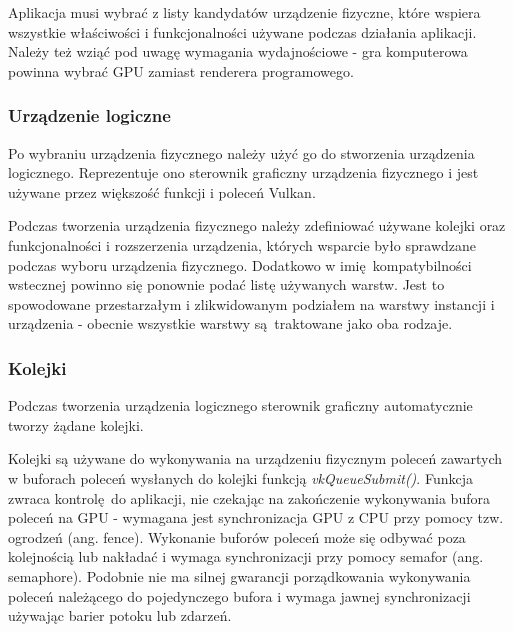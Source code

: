 Aplikacja musi wybrać z listy kandydatów urządzenie fizyczne, które wspiera wszystkie właściwości i funkcjonalności używane podczas działania aplikacji. Należy też wziąć pod uwagę wymagania wydajnościowe - gra komputerowa powinna wybrać GPU zamiast renderera programowego.


\subsubsection{Urządzenie logiczne}

Po wybraniu urządzenia fizycznego należy użyć go do stworzenia urządzenia logicznego. Reprezentuje ono
sterownik graficzny urządzenia fizycznego i jest używane przez większość funkcji i poleceń Vulkan.

Podczas tworzenia urządzenia fizycznego należy zdefiniować używane kolejki oraz funkcjonalności i rozszerzenia urządzenia, których wsparcie było sprawdzane podczas wyboru urządzenia fizycznego.
Dodatkowo w imię kompatybilności wstecznej powinno się ponownie podać listę używanych warstw. Jest to spowodowane przestarzałym i zlikwidowanym podziałem na warstwy instancji i urządzenia - obecnie wszystkie warstwy są traktowane jako oba rodzaje.


\subsubsection{Kolejki}

Podczas tworzenia urządzenia logicznego sterownik graficzny automatycznie tworzy żądane kolejki.

Kolejki są używane do wykonywania na urządzeniu fizycznym poleceń zawartych w buforach poleceń wysłanych do kolejki funkcją \textit{vkQueueSubmit()}. Funkcja zwraca kontrolę do aplikacji, nie czekając na zakończenie wykonywania bufora poleceń na GPU - wymagana jest synchronizacja GPU z CPU przy pomocy tzw. ogrodzeń (ang. fence).
Wykonanie buforów poleceń może się odbywać poza kolejnością lub nakładać i wymaga synchronizacji przy pomocy semafor (ang. semaphore).
Podobnie nie ma silnej gwarancji porządkowania wykonywania poleceń należącego do pojedynczego bufora i wymaga jawnej synchronizacji używając barier potoku lub zdarzeń.

